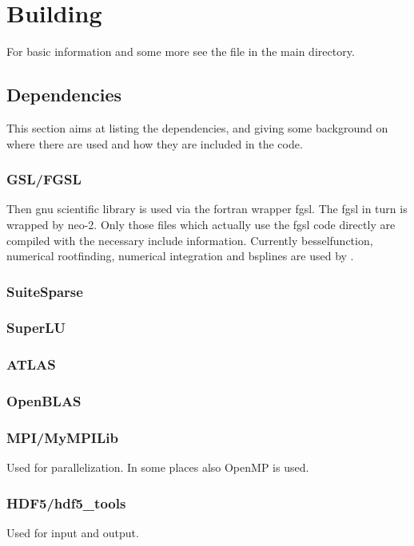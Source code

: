 \chapter{Building}
For basic information and some more see the file  in the
\neotwo main directory.

\section{Dependencies}
This section aims at listing the dependencies, and giving some
background on where there are used and how they are included in the
code.

\subsection{GSL/FGSL}
Then gnu scientific library is used via the fortran wrapper fgsl. The
fgsl in turn is wrapped by neo-2. Only those files which actually use
the fgsl code directly are compiled with the necessary include
information.
Currently besselfunction, numerical rootfinding, numerical integration
and bsplines are used by \neotwo.

\subsection{SuiteSparse}

\subsection{SuperLU}

\subsection{ATLAS}

\subsection{OpenBLAS}

\subsection{MPI/MyMPILib}
Used for parallelization. In some places also OpenMP is used.

\subsection{HDF5/hdf5\_tools}
Used for input and output.
